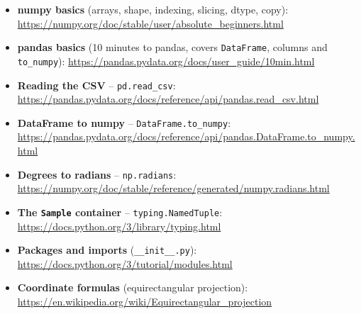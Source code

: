 \documentclass{article}
\newcommand{\lnk}[1]{{\footnotesize\url{#1}}}
\begin{document}
\begin{itemize}
\item \textbf{numpy basics} (arrays, shape, indexing, slicing, dtype, copy): \lnk{https://numpy.org/doc/stable/user/absolute_beginners.html}
\item \textbf{pandas basics} (10 minutes to pandas, covers \texttt{DataFrame},
      columns and \texttt{to\_numpy}): \lnk{https://pandas.pydata.org/docs/user_guide/10min.html}
\item \textbf{Reading the CSV} -- \texttt{pd.read\_csv}: \lnk{https://pandas.pydata.org/docs/reference/api/pandas.read_csv.html}
\item \textbf{DataFrame to numpy} -- \texttt{DataFrame.to\_numpy}: \lnk{https://pandas.pydata.org/docs/reference/api/pandas.DataFrame.to_numpy.html}
\item \textbf{Degrees to radians} -- \texttt{np.radians}: \lnk{https://numpy.org/doc/stable/reference/generated/numpy.radians.html}
\item \textbf{The \texttt{Sample} container} -- \texttt{typing.NamedTuple}: \lnk{https://docs.python.org/3/library/typing.html}
\item \textbf{Packages and imports} (\texttt{\_\_init\_\_.py}): \lnk{https://docs.python.org/3/tutorial/modules.html}
\item \textbf{Coordinate formulas} (equirectangular projection):
      \lnk{https://en.wikipedia.org/wiki/Equirectangular_projection}
\end{itemize}
\end{document}
